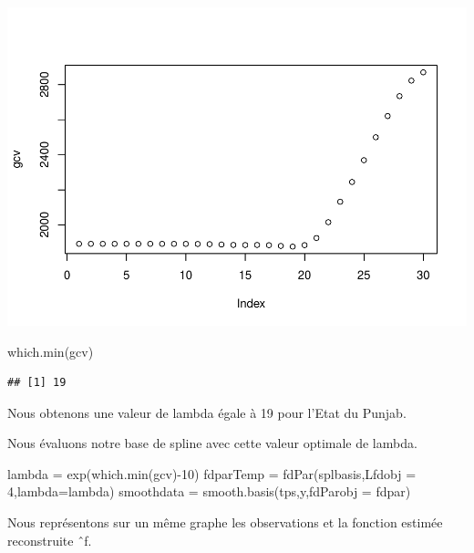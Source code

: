 \documentclass[
]{article}
\newenvironment{Shaded}{\begin{snugshade}}{\end{snugshade}}
\newcommand{\AttributeTok}[1]{\textcolor[rgb]{0.77,0.63,0.00}{#1}}
\newcommand{\DecValTok}[1]{\textcolor[rgb]{0.00,0.00,0.81}{#1}}
\newcommand{\FunctionTok}[1]{\textcolor[rgb]{0.00,0.00,0.00}{#1}}
\newcommand{\NormalTok}[1]{#1}
\newcommand{\OtherTok}[1]{\textcolor[rgb]{0.56,0.35,0.01}{#1}}
\newcommand{\SpecialCharTok}[1]{\textcolor[rgb]{0.00,0.00,0.00}{#1}}
\begin{document}
\includegraphics{Projet_CHESNAIS_GUIBERT_files/figure-latex/unnamed-chunk-24-1.pdf}

\begin{Shaded}
\begin{Highlighting}[]
\FunctionTok{which.min}\NormalTok{(gcv)}
\end{Highlighting}
\end{Shaded}

\begin{verbatim}
## [1] 19
\end{verbatim}

Nous obtenons une valeur de lambda égale à 19 pour l'Etat du Punjab.

Nous évaluons notre base de spline avec cette valeur optimale de lambda.

\begin{Shaded}
\begin{Highlighting}[]
\NormalTok{lambda }\OtherTok{=} \FunctionTok{exp}\NormalTok{(}\FunctionTok{which.min}\NormalTok{(gcv)}\SpecialCharTok{{-}}\DecValTok{10}\NormalTok{)}
\NormalTok{fdparTemp }\OtherTok{=} \FunctionTok{fdPar}\NormalTok{(splbasis,}\AttributeTok{Lfdobj =} \DecValTok{4}\NormalTok{,}\AttributeTok{lambda=}\NormalTok{lambda) }
\NormalTok{smoothdata }\OtherTok{=} \FunctionTok{smooth.basis}\NormalTok{(tps,y,}\AttributeTok{fdParobj =}\NormalTok{ fdpar)}
\end{Highlighting}
\end{Shaded}

Nous représentons sur un même graphe les observations et la fonction
estimée reconstruite ˆf.
\end{document}
